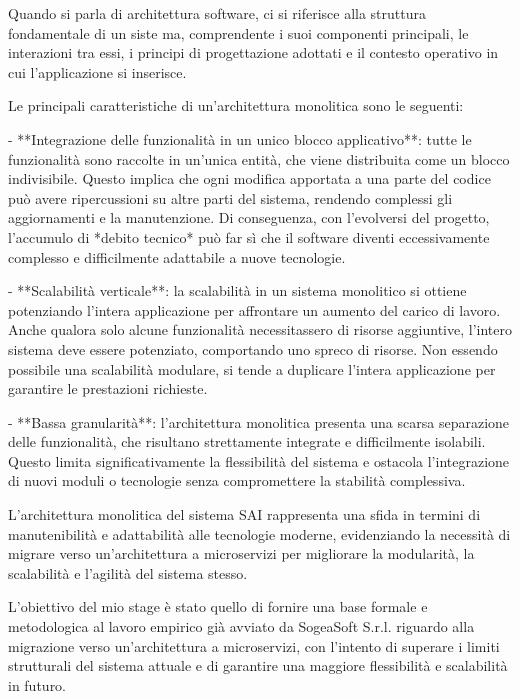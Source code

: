         Quando si parla di architettura software, ci si riferisce alla struttura fondamentale di un siste ma, comprendente i suoi componenti principali, le interazioni tra essi, i principi di progettazione adottati e il contesto operativo in cui l’applicazione si inserisce.

        Le principali caratteristiche di un’architettura monolitica sono le seguenti:  

        - **Integrazione delle funzionalità in un unico blocco applicativo**: tutte le funzionalità sono raccolte in un’unica entità, che viene distribuita come un blocco indivisibile. Questo implica che ogni modifica apportata a una parte del codice può avere ripercussioni su altre parti del sistema, rendendo complessi gli aggiornamenti e la manutenzione. Di conseguenza, con l’evolversi del progetto, l’accumulo di *debito tecnico* può far sì che il software diventi eccessivamente complesso e difficilmente adattabile a nuove tecnologie.  

        - **Scalabilità verticale**: la scalabilità in un sistema monolitico si ottiene potenziando l’intera applicazione per affrontare un aumento del carico di lavoro. Anche qualora solo alcune funzionalità necessitassero di risorse aggiuntive, l’intero sistema deve essere potenziato, comportando uno spreco di risorse. Non essendo possibile una scalabilità modulare, si tende a duplicare l’intera applicazione per garantire le prestazioni richieste.  

        - **Bassa granularità**: l’architettura monolitica presenta una scarsa separazione delle funzionalità, che risultano strettamente integrate e difficilmente isolabili. Questo limita significativamente la flessibilità del sistema e ostacola l’integrazione di nuovi moduli o tecnologie senza compromettere la stabilità complessiva.  

        L’architettura monolitica del sistema SAI rappresenta una sfida in termini di manutenibilità e adattabilità alle tecnologie moderne, evidenziando la necessità di migrare verso un’architettura a microservizi per migliorare la modularità, la scalabilità e l’agilità del sistema stesso.
        
        L'obiettivo del mio stage è stato quello di fornire una base formale e metodologica al lavoro empirico già avviato da SogeaSoft S.r.l. riguardo alla migrazione verso un'architettura a microservizi, con l’intento di superare i limiti strutturali del sistema attuale e di garantire una maggiore flessibilità e scalabilità in futuro.
        
